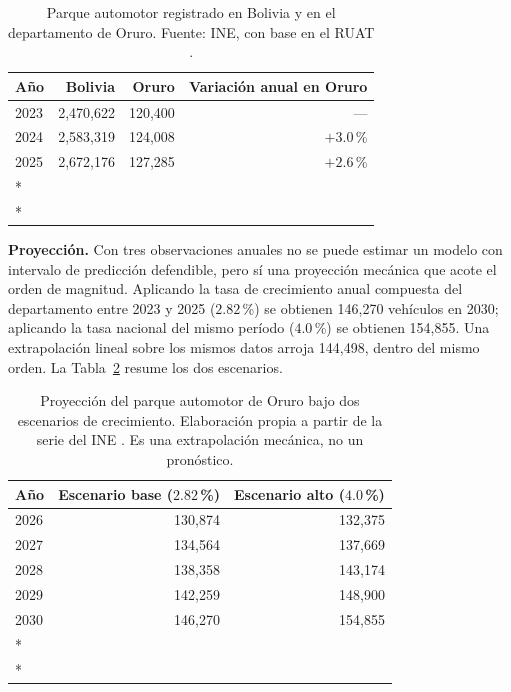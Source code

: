 \begin{table}[H]
    \centering
    \caption{Parque automotor registrado en Bolivia y en el departamento de Oruro.
    Fuente: INE, con base en el RUAT \cite{ine2026parqueautomotor}.}
    \label{tab:parque_automotor}
    \begin{tabular}{lrrr}
        \toprule
        \textbf{Año} & \textbf{Bolivia} & \textbf{Oruro} &
        \textbf{Variación anual en Oruro} \\
        \midrule
        2023 & 2,470,622 & 120,400 & --- \\
        2024 & 2,583,319 & 124,008 & $+3{.}0$\,\% \\
        2025 & 2,672,176 & 127,285 & $+2{.}6$\,\% \\*
        \multicolumn{3}{r}{\footnotesize\textit{Fuente: INE, con base en el RUAT}} \\*
        \bottomrule
    \end{tabular}
\end{table}

\textbf{Proyección.} Con tres observaciones anuales no se puede estimar un modelo
con intervalo de predicción defendible, pero sí una proyección mecánica que acote
el orden de magnitud. Aplicando la tasa de crecimiento anual compuesta del
departamento entre 2023 y 2025 ($2{.}82$\,\%) se obtienen 146,270 vehículos en
2030; aplicando la tasa nacional del mismo período ($4{.}0$\,\%) se obtienen
154,855. Una extrapolación lineal sobre los mismos datos arroja 144,498, dentro
del mismo orden. La Tabla~\ref{tab:proyeccion_parque} resume los dos escenarios.

\begin{table}[H]
    \centering
    \caption{Proyección del parque automotor de Oruro bajo dos escenarios de
    crecimiento. Elaboración propia a partir de la serie del INE
    \cite{ine2026parqueautomotor}. Es una extrapolación mecánica, no un
    pronóstico.}
    \label{tab:proyeccion_parque}
    \begin{tabular}{lrr}
        \toprule
        \textbf{Año} & \textbf{Escenario base ($2{.}82$\,\%)} &
        \textbf{Escenario alto ($4{.}0$\,\%)} \\
        \midrule
        2026 & 130,874 & 132,375 \\
        2027 & 134,564 & 137,669 \\
        2028 & 138,358 & 143,174 \\
        2029 & 142,259 & 148,900 \\
        2030 & 146,270 & 154,855 \\*
        \multicolumn{3}{r}{\footnotesize\textit{Fuente: Elaboración propia}} \\*
        \bottomrule
    \end{tabular}
\end{table}


